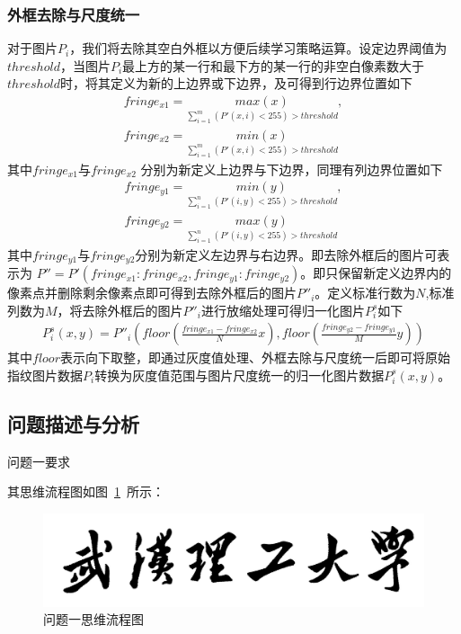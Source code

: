 \documentclass{whutmod}
\begin{document}
	  	\subsubsection{外框去除与尺度统一}
	  	对于图片$P_{i}$，我们将去除其空白外框以方便后续学习策略运算。设定边界阈值为$threshold$，当图片$P_{i}$最上方的某一行和最下方的某一行的非空白像素数大于$threshold$时，将其定义为新的上边界或下边界，及可得到行边界位置如下
	    \begin{gather*}
	  	fringe_{x1}=\underset{\sum_{i=1}^{m} (P'(x,i)<255)>threshold}{max(x)},\\
	  	fringe_{x2}=\underset{\sum_{i=1}^{m} (P'(x,i)<255)>threshold}{min(x)}
	  	\end{gather*}
	  	其中$fringe_{x1}$与$fringe_{x2}$ 分别为新定义上边界与下边界，同理有列边界位置如下
	   \begin{gather*}
	  	fringe_{y1}=\underset{\sum_{i=1}^{n} (P'(i,y)<255)>threshold}{min(y)},\\
	  	fringe_{y2}=\underset{\sum_{i=1}^{n} (P'(i,y)<255)>threshold}{max(y)}
	  	\end{gather*}
	  	其中$fringe_{y1}$与$fringe_{y2}$分别为新定义左边界与右边界。即去除外框后的图片可表示为	$P''=P'(	fringe_{x1}:	fringe_{x2},	fringe_{y1}:	fringe_{y2})$。即只保留新定义边界内的像素点并删除剩余像素点即可得到去除外框后的图片$P''_{i}$。定义标准行数为$N$,标准列数为$M$，将去除外框后的图片$P''_{i}$进行放缩处理可得归一化图片$P_{i}^s$如下
	  	\begin{gather*}
	  	P_{i}^s(x,y)=P''_{i}(floor(\frac{fringe_{x1}-fringe_{x2}}{N}x),floor(\frac{fringe_{y2}-fringe_{y1}}{M}y))
	  	\end{gather*}
	  	其中$floor$表示向下取整，即通过灰度值处理、外框去除与尺度统一后即可将原始指纹图片数据$P_{i}$转换为灰度值范围与图片尺度统一的归一化图片数据$P_{i}^s(x,y)$。
	  	
	  	 	  	
		\subsection{问题描述与分析}
			问题一要求
		
			其思维流程图如图~\ref{lct}~所示：
			\begin{figure}[H]
				\centering
				\includegraphics[width=\textwidth]{figures/whut.jpg}
				\caption{问题一思维流程图}\label{lct}
			\end{figure}
			
\end{document}

